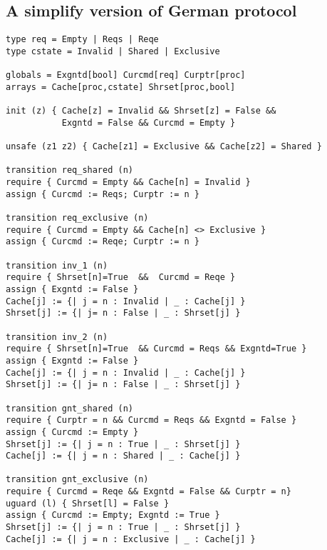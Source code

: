 \documentclass[a4paper,12pt]{article}
\begin{document}
\subsection{A simplify version of German protocol}

\begin{verbatim}
type req = Empty | Reqs | Reqe
type cstate = Invalid | Shared | Exclusive

globals = Exgntd[bool] Curcmd[req] Curptr[proc]
arrays = Cache[proc,cstate] Shrset[proc,bool]

init (z) { Cache[z] = Invalid && Shrset[z] = False &&
           Exgntd = False && Curcmd = Empty }

unsafe (z1 z2) { Cache[z1] = Exclusive && Cache[z2] = Shared }

transition req_shared (n)
require { Curcmd = Empty && Cache[n] = Invalid }
assign { Curcmd := Reqs; Curptr := n }
    
transition req_exclusive (n)
require { Curcmd = Empty && Cache[n] <> Exclusive }
assign { Curcmd := Reqe; Curptr := n }
    
transition inv_1 (n)
require { Shrset[n]=True  &&  Curcmd = Reqe }
assign { Exgntd := False }
Cache[j] := {| j = n : Invalid | _ : Cache[j] }
Shrset[j] := {| j= n : False | _ : Shrset[j] }

transition inv_2 (n)
require { Shrset[n]=True  && Curcmd = Reqs && Exgntd=True }
assign { Exgntd := False }
Cache[j] := {| j = n : Invalid | _ : Cache[j] }
Shrset[j] := {| j= n : False | _ : Shrset[j] }
    
transition gnt_shared (n)
require { Curptr = n && Curcmd = Reqs && Exgntd = False }
assign { Curcmd := Empty }
Shrset[j] := {| j = n : True | _ : Shrset[j] }
Cache[j] := {| j = n : Shared | _ : Cache[j] }

transition gnt_exclusive (n)
require { Curcmd = Reqe && Exgntd = False && Curptr = n}
uguard (l) { Shrset[l] = False }
assign { Curcmd := Empty; Exgntd := True }
Shrset[j] := {| j = n : True | _ : Shrset[j] }
Cache[j] := {| j = n : Exclusive | _ : Cache[j] }
\end{verbatim}
\end{document}
